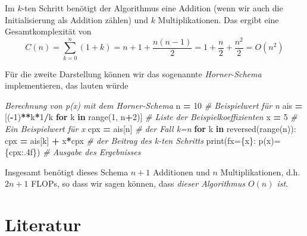 \documentclass[
]{book}
\newenvironment{Shaded}{\begin{snugshade}}{\end{snugshade}}
\newcommand{\BuiltInTok}[1]{#1}
\newcommand{\CommentTok}[1]{\textcolor[rgb]{0.56,0.35,0.01}{\textit{#1}}}
\newcommand{\ControlFlowTok}[1]{\textcolor[rgb]{0.13,0.29,0.53}{\textbf{#1}}}
\newcommand{\DecValTok}[1]{\textcolor[rgb]{0.00,0.00,0.81}{#1}}
\newcommand{\KeywordTok}[1]{\textcolor[rgb]{0.13,0.29,0.53}{\textbf{#1}}}
\newcommand{\NormalTok}[1]{#1}
\newcommand{\OperatorTok}[1]{\textcolor[rgb]{0.81,0.36,0.00}{\textbf{#1}}}
\newcommand{\SpecialCharTok}[1]{\textcolor[rgb]{0.00,0.00,0.00}{#1}}
\newcommand{\SpecialStringTok}[1]{\textcolor[rgb]{0.31,0.60,0.02}{#1}}
\theoremstyle{definition}
\theoremstyle{definition}
\theoremstyle{definition}
\theoremstyle{definition}
\theoremstyle{remark}
\begin{document}
Im \(k\)-ten Schritt benötigt der Algorithmus eine Addition (wenn wir auch die Initialisierung als Addition zählen) und \(k\) Multiplikationen. Das ergibt eine Gesamtkomplexität von
\begin{equation*}
C(n) = \sum_{k=0}^n(1+k) = n+1 + \frac{n(n-1)}{2} = 1 + \frac n2 + \frac{n^2}2 = O(n^2)
\end{equation*}

Für die zweite Darstellung können wir das sogenannte \emph{Horner-Schema} implementieren, das lauten würde

\begin{Shaded}
\begin{Highlighting}[]
\CommentTok{\textquotesingle{}\textquotesingle{}\textquotesingle{}Berechnung von p(x) mit dem Horner{-}Schema}
\CommentTok{\textquotesingle{}\textquotesingle{}\textquotesingle{}}
\NormalTok{n }\OperatorTok{=} \DecValTok{10}                                      \CommentTok{\# Beispielwert für n}
\NormalTok{ais }\OperatorTok{=}\NormalTok{ [(}\OperatorTok{{-}}\DecValTok{1}\NormalTok{)}\OperatorTok{**}\NormalTok{k}\OperatorTok{*}\DecValTok{1}\OperatorTok{/}\NormalTok{k }\ControlFlowTok{for}\NormalTok{ k }\KeywordTok{in} \BuiltInTok{range}\NormalTok{(}\DecValTok{1}\NormalTok{, n}\OperatorTok{+}\DecValTok{2}\NormalTok{)]  }\CommentTok{\# Liste der Beispielkoeffizienten}
\NormalTok{x }\OperatorTok{=} \DecValTok{5}                                       \CommentTok{\# Ein Beispielwert für x}
\NormalTok{cpx }\OperatorTok{=}\NormalTok{ ais[n]                                }\CommentTok{\# der Fall k=n}
\ControlFlowTok{for}\NormalTok{ k }\KeywordTok{in} \BuiltInTok{reversed}\NormalTok{(}\BuiltInTok{range}\NormalTok{(n)):                }
\NormalTok{    cpx }\OperatorTok{=}\NormalTok{ ais[k] }\OperatorTok{+}\NormalTok{ x}\OperatorTok{*}\NormalTok{cpx                    }\CommentTok{\# der Beitrag des k{-}ten Schritts}
\BuiltInTok{print}\NormalTok{(}\SpecialStringTok{f\textquotesingle{}x=}\SpecialCharTok{\{x\}}\SpecialStringTok{: p(x)=}\SpecialCharTok{\{}\NormalTok{cpx}\SpecialCharTok{:.4f\}}\SpecialStringTok{\textquotesingle{}}\NormalTok{)             }\CommentTok{\# Ausgabe des Ergebnisses}
\end{Highlighting}
\end{Shaded}

Insgesamt benötigt dieses Schema \(n+1\) Additionen und \(n\) Multiplikationen, d.h. \(2n+1\) FLOPs, so dass wir sagen können, dass \emph{dieser Algorithmus \(O(n)\) ist}.

\hypertarget{literatur}{%
\section{Literatur}\label{literatur}}
\end{document}
